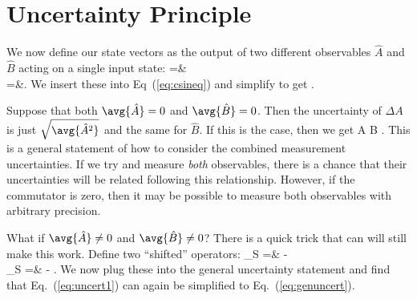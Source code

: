 \section{Uncertainty Principle}
\label{sec:generaluncertaintysection}
We now define our state vectors as the output of two different observables $\hat{A}$ and $\hat{B}$ acting on a single input state:
\bas
{} =& \ket{\Psi} \\
 =&\I {}\ket{\Psi}.
\eas
We insert these into Eq~(\ref{eq:csineq}) and simplify to get 
 \geq {}.
\label{eq:uncert1}
\eeq

Suppose that both $\avg{\hat{A}}=0$ and $\avg{\hat{B}}=0$. Then the uncertainty of $\Delta A$ is just $\sqrt{\avg{\hat{A}^2}}$ and the same for $\hat{B}$. If this is the case, then we get
\beq
\Delta A \Delta B \geq {} .
\label{eq:genuncert}
\eeq
This is a general statement of how to consider the combined measurement uncertainties. If we try and measure {\em both} observables, there is a chance that their uncertainties will be related following this relationship. However, if the commutator is zero, then it may be possible to measure both observables with arbitrary precision.

What if $\avg{\hat{A}}\neq0$ and $\avg{\hat{B}}\neq0$? There is a quick trick that can will still make this work. Define two ``shifted'' operators:
\bas
{}_S =&  - \\
_S =&  - .
\eas
We now plug these into the general uncertainty statement and find that Eq.~(\ref{eq:uncert1}) can again be simplified to Eq.~(\ref{eq:genuncert}).

